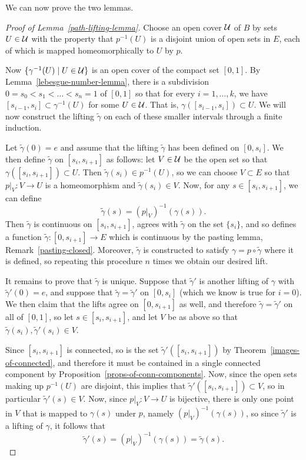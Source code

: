 We can now prove the two lemmas.%
\begin{proof}[Proof of Lemma~\ref{path-lifting-lemma}]
  Choose an open cover $\mathcal{U}$ of $B$ by sets $U \in \mathcal{U}$ with the property that $p^{-1}(U)$ is a disjoint union of open sets in $E$, each of which is mapped homeomorphically to $U$ by $p$.
  
  Now $\{\gamma^{-1}(U) \mid U \in \mathcal{U}\}$ is an open cover of the compact set $[0,1]$. By Lemma~\ref{lebesgue-number-lemma}, there is a subdivision $0 = s_0 < s_1 < \dots < s_n = 1$ of $[0,1]$ so that for every $i = 1, \dots, k$, we have $[s_{i-1},s_i] \subset \gamma^{-1}(U)$ for some $U \in \mathcal{U}$. That is, $\gamma([s_{i-1},s_i]) \subset U$. We will now construct the lifting $\tilde{\gamma}$ on each of these smaller intervals through a finite induction.
  
  Let $\tilde{\gamma}(0) = e$ and assume that the lifting $\tilde{\gamma}$ has been defined on $[0,s_i]$. We then define $\tilde{\gamma}$ on $[s_i,s_{i+1}]$ as follows: let $V \in \mathcal{U}$ be the open set so that $\gamma([s_i,s_{i+1}]) \subset U$. Then $\tilde{\gamma}(s_i) \in p^{-1}(U)$, so we can choose $V \subset E$ so that $p|_V : V \to U$ is a homeomorphism and $\tilde{\gamma}(s_i) \in V$. Now, for any $s \in [s_i,s_{i+1}]$, we can define
  \[
    \tilde{\gamma}(s) = (p|_V)^{-1}(\gamma(s)).
  \]
  Then $\tilde{\gamma}$ is continuous on $[s_i,s_{i+1}]$, agrees with $\tilde{\gamma}$ on the set $\{s_i\}$, and so defines a function $\tilde{\gamma} : [0,s_{i+1}] \to E$ which is continuous by the pasting lemma, Remark~\ref{pasting-closed}. Moreover, $\tilde{\gamma}$ is constructed to satisfy $\gamma = p \circ \tilde{\gamma}$ where it is defined, so repeating this procedure $n$ times we obtain our desired lift.
  
  It remains to prove that $\tilde{\gamma}$ is unique. Suppose that $\tilde{\gamma}'$ is another lifting of $\gamma$ with $\tilde{\gamma}'(0) = e$, and suppose that $\tilde{\gamma} = \tilde{\gamma}'$ on $[0,s_i]$ (which we know is true for $i=0$). We then claim that the lifts agree on $[0,s_{i+1}]$ as well, and therefore $\tilde{\gamma} = \tilde{\gamma}'$ on all of $[0,1]$, so let $s \in [s_i,s_{i+1}]$, and let $V$ be as above so that $\tilde{\gamma}(s_i), \tilde{\gamma}'(s_i) \in V$.
  
  Since $[s_i,s_{i+1}]$ is connected, so is the set $\tilde{\gamma}'([s_i,s_{i+1}])$ by Theorem~\ref{images-of-connected}, and therefore it must be contained in a single connected component by Proposition~\ref{props-of-conn-components}. Now, since the open sets making up $p^{-1}(U)$ are disjoint, this implies that $\tilde{\gamma}'([s_i,s_{i+1}]) \subset V$, so in particular $\tilde{\gamma}'(s) \in V$. Now, since $p|_V : V \to U$ is bijective, there is only one point in $V$ that is mapped to $\gamma(s)$ under $p$, namely $(p|_V)^{-1}(\gamma(s))$, so since $\tilde{\gamma}'$ is a lifting of $\gamma$, it follows that
  \[
    \tilde{\gamma}'(s) = (p|_V)^{-1}(\gamma(s)) = \tilde{\gamma}(s).
  \]
\end{proof}

